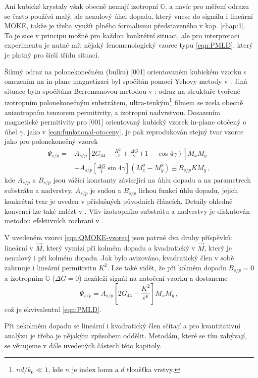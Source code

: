 Ani kubické krystaly však obecně nemají izotropní $\mathbb{G}$\cite{hamrlovaQuadraticinmagnetizationPermittivityConductivity2013}, a navíc pro měření odrazu se často používá malý, ale nenulový úhel dopadu, který vnese do signálu i lineární MOKE, takže je třeba využít plného formalismu představeného v kap. \ref{chap:1}.
To je sice v principu možné pro každou konkrétní situaci, ale pro interpretaci experimentu je nutné mít nějaký fenomenologický vzorec typu \eqref{eqn:PMLD}, který je platný pro širší třídu situací.

Šikmý odraz na polonekonečném (bulku) [001] orientovaném kubickém vzorku s omezením na in-plane magnetizaci byl spočítán pomocí Yehovy metody v \cite{postavaAnisotropyQuadraticMagnetooptic2002}.
Jiná situace byla spočítána Berremanovou metodou v \cite{hamrleVicinalInterfaceSensitive2003}: odraz na struktuře tvořené izotropním polonekonečným substrátem,
ultra-tenkým\footnote{$nd/k_0 \ll 1$, kde $n$ je index lomu a $d$ tloušťka vrstvy.}
filmem se zcela obecně anizotropním tenzorem permitivity, a izotropní nadvrstvou.
Dosazením magnetické permitivity pro [001] orientovaný kubický vzorek in-plane otočený o úhel $\gamma$, jako v \eqref{eqn:funkcional-otoceny}, je pak reprodukován stejný tvar vzorce jako pro polonekonečný vzorek
\begin{align} 
\label{eqn:QMOKE-vzorec}
    \Psi_{s/p}=
    & A_{s/p} \left[ 2G_{44}-\frac{K^2}{\varepsilon^0}+\frac{\Delta G}{2}(1-\cos 4\gamma)  \right] M_x M_y\\
    & + A_{s/p} \left[ \frac{\Delta G}{4}\sin 4\gamma  \right] \left(M_x^2-M_y^2\right) \pm B_{s/p} K M_y \,,
\end{align}
kde $A_{s/p}$ a $B_{s/p}$ jsou vážící konstanty závisející na úhlu dopadu a na parametrech substrátu a nadvrstvy. 
$A_{s/p}$ je sudou a $B_{s/p}$ lichou funkcí úhlu dopadu, jejich konkrétní tvar je uveden v příslušných původních článcích\cite{postavaAnisotropyQuadraticMagnetooptic2002,hamrleVicinalInterfaceSensitive2003}.
Detaily ohledně konvencí lze také nalézt v \cite{silberQuadraticMagnetoopticKerr2019a}.
Vliv izotropního substrátu a nadvrstvy je diskutován metodou efektivních rozhraní v \cite{visnovskyPolarMagnetoopticsSimple1995}. 

V uvedeném vzorci \eqref{eqn:QMOKE-vzorec} jsou patrné dva druhy příspěvků: lineární v $\vec{M}$, který vymizí při kolmém dopadu a kvadratický v $\vec{M}$, který je nenulový i při kolmém dopadu.
Jak bylo avizováno, kvadratický člen v sobě zahrnuje i lineární permitivitu $K^2$.
Lze také vidět, že při kolmém dopadu $B_{s/p}=0$ a izotropním $\mathbb{G}$ ($\Delta G=0$) nezáleží signál na natočení vzorku a dostaneme
\begin{equation}
    \Psi_{s/p}=A_{s/p} \left[ 2G_{44}-\frac{K^2}{\varepsilon^0}  \right] M_x M_y \,,
\end{equation}
což je ekvivalentní \eqref{eqn:PMLD}.

Při nekolmém dopadu se lineární i kvadratický člen sčítají a pro kvantitativní analýzu je třeba je nějakým způsobem oddělit.
Metodám, které se tím zabývají, se věnujeme v dále uvedených částech této kapitoly.
